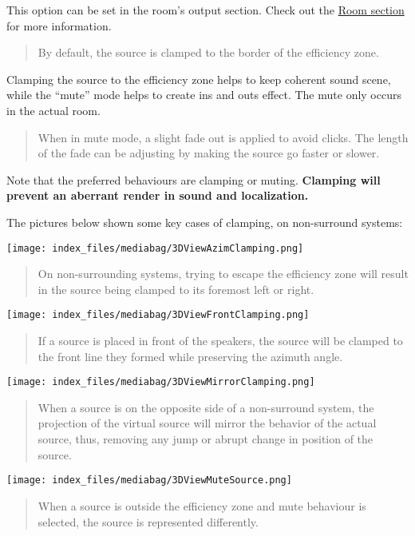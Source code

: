 \documentclass[
  letterpaper,
  DIV=11,
  numbers=noendperiod]{scrreport}
\begin{document}
This option can be set in the room's output section. Check out the
\href{Spat_Environment_Room.md}{Room section} for more information.

\begin{quote}
By default, the source is clamped to the border of the efficiency zone.
\end{quote}

Clamping the source to the efficiency zone helps to keep coherent sound
scene, while the ``mute'' mode helps to create ins and outs effect. The
mute only occurs in the actual room.

\begin{quote}
When in mute mode, a slight fade out is applied to avoid clicks. The
length of the fade can be adjusting by making the source go faster or
slower.
\end{quote}

Note that the preferred behaviours are clamping or muting.
\textbf{Clamping will prevent an aberrant render in sound and
localization.}

The pictures below shown some key cases of clamping, on non-surround
systems:

\texttt{[image: index\_files/mediabag/3DViewAzimClamping.png]}

\begin{quote}
On non-surrounding systems, trying to escape the efficiency zone will
result in the source being clamped to its foremost left or right.
\end{quote}

\texttt{[image: index\_files/mediabag/3DViewFrontClamping.png]}

\begin{quote}
If a source is placed in front of the speakers, the source will be
clamped to the front line they formed while preserving the azimuth
angle.
\end{quote}

\texttt{[image: index\_files/mediabag/3DViewMirrorClamping.png]}

\begin{quote}
When a source is on the opposite side of a non-surround system, the
projection of the virtual source will mirror the behavior of the actual
source, thus, removing any jump or abrupt change in position of the
source.
\end{quote}

\texttt{[image: index\_files/mediabag/3DViewMuteSource.png]}

\begin{quote}
When a source is outside the efficiency zone and mute behaviour is
selected, the source is represented differently.
\end{quote}
\end{document}
